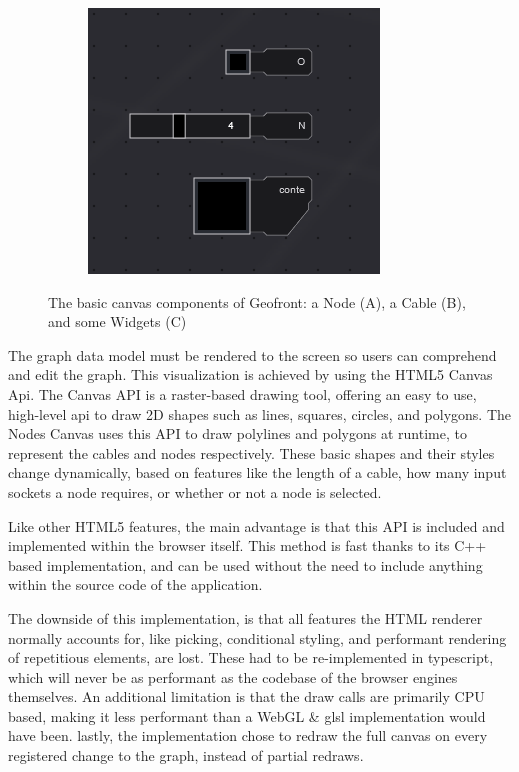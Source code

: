 \begin{figure}
\begin{subfigure}[b]{0.30\linewidth}
    \graphicspath{ {../../assets/images/implementation/} }
    \centering
    \includegraphics[width=\linewidth]{widgets.png}
    \caption{}\label{fig:node-cable:3}
  \end{subfigure}%
  \caption[Nodes, Widgets and Cables]{The basic canvas components of Geofront: a Node (A), a Cable (B), and some Widgets (C) }
  \label{fig:node-cable}
\end{figure}

The graph data model must be rendered to the screen so users can comprehend and edit the graph. 
This visualization is achieved by using the HTML5 Canvas Api. 
The Canvas API is a raster-based drawing tool, offering an easy to use, high-level api to draw 2D shapes such as lines, squares, circles, and polygons. 
The Nodes Canvas uses this API to draw polylines and polygons at runtime, to represent the cables and nodes respectively. 
These basic shapes and their styles change dynamically, based on features like the length of a cable, how many input sockets a node requires, or whether or not a node is selected. 

Like other HTML5 features, the main advantage is that this API is included and implemented within the browser itself. This method is fast thanks to its C++ based implementation, and can be used without the need to include anything within the source code of the application.

The downside of this implementation, is that all features the HTML renderer normally accounts for, like picking, conditional styling, and performant rendering of repetitious elements, are lost.
These had to be re-implemented in typescript, which will never be as performant as the codebase of the browser engines themselves. 
An additional limitation is that the draw calls are primarily CPU based, 
making it less performant than a WebGL \& glsl implementation would have been.
lastly, the implementation chose to redraw the full canvas on every registered change to the graph, instead of partial redraws. 

